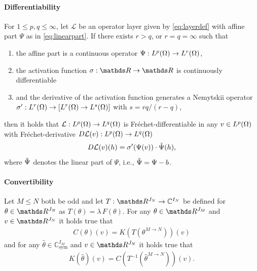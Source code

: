 \paragraph{Differentiability}

\begin{proposition}{\cite[Prop. 2]{kabri2023resolution}}{}
	For $1 \leq p, q \leq \infty$, let $\mathcal{L}$ be an operator layer given by \eqref{eq:layerdef} with affine part $\Psi$ as in \eqref{eq:linearpart}. If there exists $r>q$, or $r = q = \infty$ such that
	\begin{enumerate}[label=(\roman*)]
		\item the affine part is a continuous operator $\Psi: L^p(\Omega) \rightarrow L^r(\Omega)$,
		\item the activation function $\sigma: \R \rightarrow \R$ is continuously differentiable
		\item and the derivative of the activation function generates a Nemytskii operator $\sigma': L^r(\Omega) \rightarrow \left[L^r(\Omega) \rightarrow L^{s}(\Omega) \right]$ with $s = {rq}/{(r-q)}$,
	\end{enumerate}
	then it holds that $\mathcal{L}:  L^p(\Omega) \rightarrow L^q(\Omega)$ is Fréchet-differentiable in any $v \in L^p(\Omega)$ with Fréchet-derivative $D\mathcal{L}(v): L^p(\Omega) \rightarrow L^q(\Omega)$
	\begin{align*}
		D\mathcal{L}(v)(h) = \sigma'(\Psi(v))\cdot\Tilde{\Psi}(h),
	\end{align*}
	where $\Tilde{\Psi}$ denotes the linear part of $\Psi$, i.e., $\Tilde{\Psi} = \Psi - b$.
\end{proposition}
%
%
\paragraph{Convertibility}
\begin{lemma}{\cite[Lem. 3]{kabri2023resolution}}{}
	Let $M \leq N$ both be odd and let $T: \R^{J_N} \rightarrow \mathbb{C}^{I_N}$ be defined for $\theta \in \R^{J_N}$ as
	$T(\theta) = \lambda \, F(\theta)$.
	For any $\theta \in \R^{J_M}$ and $v \in \R^{J_N}$ it holds true that
	\begin{align*}
		C(\theta)(v) = K(T(\theta^{M\rightarrow N}))(v)
	\end{align*}
	and for any $\hat{\theta} \in \mathbb{C}^{I_M}_{\text{sym}}$ and $v \in \R^{J_N}$ it holds true that
	\begin{align*}
		K(\hat{\theta})(v) = C(T^{-1}(\hat{\theta}^{M\rightarrow N}))(v).
	\end{align*}
\end{lemma}


